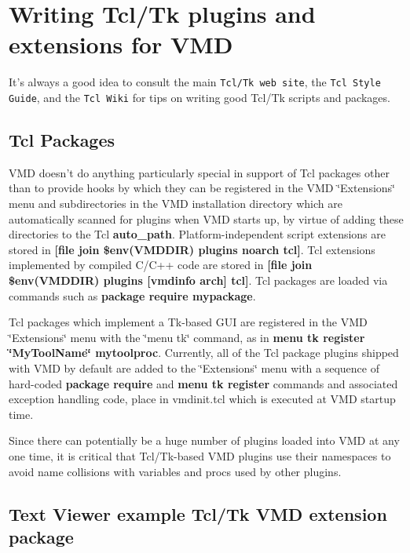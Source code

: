 \section{Writing Tcl/Tk plugins and extensions for VMD}\label{tcltkplugins}




 It's always a good idea to consult the main {\tt Tcl/Tk web site}, the {\tt  Tcl Style Guide}, and the {\tt Tcl Wiki} for tips on writing good Tcl/Tk scripts and packages.

\subsection*{Tcl Packages}
 VMD doesn't do anything particularly special in support of Tcl packages other than to provide hooks by which they can be registered in the VMD \char`\"{}Extensions\char`\"{} menu and subdirectories in the VMD installation directory which are automatically scanned for plugins when VMD starts up, by virtue of adding these directories to the Tcl {\bf auto\_\-path}. Platform-independent script extensions  are stored in  {\bf [file join \$env(VMDDIR) plugins noarch tcl]}. Tcl extensions implemented by compiled C/C++ code are stored in {\bf [file join \$env(VMDDIR) plugins [vmdinfo arch] tcl]}. Tcl packages are loaded via commands such as {\bf package require mypackage}.



 Tcl packages which implement a Tk-based GUI are registered in the  VMD \char`\"{}Extensions\char`\"{} menu with the \char`\"{}menu tk\char`\"{} command, as in  {\bf menu tk register \char`\"{}My\-Tool\-Name\char`\"{} mytoolproc}. Currently, all of the Tcl package plugins shipped with VMD by default  are added to the \char`\"{}Extensions\char`\"{} menu with a sequence of hard-coded  {\bf package require} and {\bf menu tk register} commands and  associated exception handling code, place in vmdinit.tcl which is executed at VMD startup time.



 Since there can potentially be a huge number of plugins loaded into VMD at any one time, it is critical that Tcl/Tk-based VMD plugins use their namespaces to avoid name collisions with variables and procs used by other plugins.

\subsection*{Text Viewer example Tcl/Tk VMD extension package}
 

